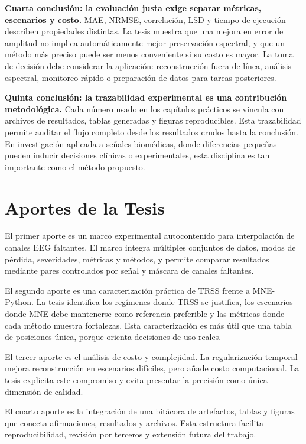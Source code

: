 \textbf{Cuarta conclusión: la evaluación justa exige separar métricas, escenarios y costo.} MAE, NRMSE, correlación, LSD y tiempo de ejecución describen propiedades distintas. La tesis muestra que una mejora en error de amplitud no implica automáticamente mejor preservación espectral, y que un método más preciso puede ser menos conveniente si su costo es mayor. La toma de decisión debe considerar la aplicación: reconstrucción fuera de línea, análisis espectral, monitoreo rápido o preparación de datos para tareas posteriores.

\textbf{Quinta conclusión: la trazabilidad experimental es una contribución metodológica.} Cada número usado en los capítulos prácticos se vincula con archivos de resultados, tablas generadas y figuras reproducibles. Esta trazabilidad permite auditar el flujo completo desde los resultados crudos hasta la conclusión. En investigación aplicada a señales biomédicas, donde diferencias pequeñas pueden inducir decisiones clínicas o experimentales, esta disciplina es tan importante como el método propuesto.

\section{Aportes de la Tesis}

El primer aporte es un marco experimental autocontenido para interpolación de canales EEG faltantes. El marco integra múltiples conjuntos de datos, modos de pérdida, severidades, métricas y métodos, y permite comparar resultados mediante pares controlados por señal y máscara de canales faltantes.

El segundo aporte es una caracterización práctica de TRSS frente a MNE-Python. La tesis identifica los regímenes donde TRSS se justifica, los escenarios donde MNE debe mantenerse como referencia preferible y las métricas donde cada método muestra fortalezas. Esta caracterización es más útil que una tabla de posiciones única, porque orienta decisiones de uso reales.

El tercer aporte es el análisis de costo y complejidad. La regularización temporal mejora reconstrucción en escenarios difíciles, pero añade costo computacional. La tesis explicita este compromiso y evita presentar la precisión como única dimensión de calidad.

El cuarto aporte es la integración de una bitácora de artefactos, tablas y figuras que conecta afirmaciones, resultados y archivos. Esta estructura facilita reproducibilidad, revisión por terceros y extensión futura del trabajo.

